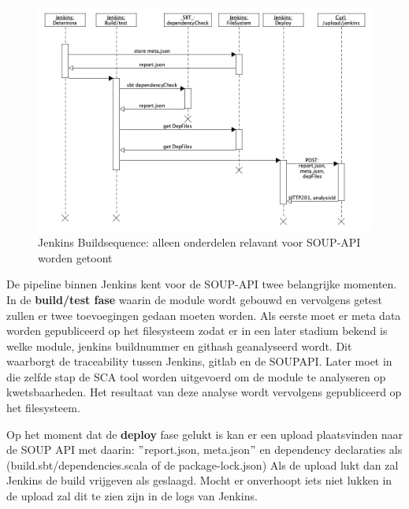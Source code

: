\begin{figure}[bth]
    \myfloatalign
    \includegraphics[width=15cm]{gfx/umlet/exports/jenkinsBuildSequence}
    \caption{Jenkins Buildsequence: alleen onderdelen relavant voor SOUP-API worden getoont}
    \label{fig:JenkinsSequece}
\end{figure}

De pipeline binnen Jenkins kent voor de SOUP-API twee belangrijke momenten. In de \textbf{build/test fase} waarin de module wordt gebouwd en vervolgens getest zullen er twee toevoegingen gedaan moeten worden. Als eerste moet er meta data worden gepubliceerd op het filesysteem zodat er in een later stadium bekend is welke module, jenkins buildnummer en githash geanalyseerd wordt. Dit waarborgt de traceability tussen Jenkins, gitlab en de SOUPAPI. Later moet in die zelfde stap de SCA tool worden uitgevoerd om de module te analyseren op kwetsbaarheden. Het resultaat van deze analyse wordt vervolgens gepubliceerd op het filesysteem.

Op het moment dat de \textbf{deploy} fase gelukt is kan er een upload plaatsvinden naar de SOUP API met daarin: $"$report.json, meta.json$"$ en dependency declaraties als (build.sbt/dependencies.scala of de package-lock.json)
Als de upload lukt dan zal Jenkins de build vrijgeven als geslaagd. Mocht er onverhoopt iets niet lukken in de upload zal dit te zien zijn in de logs van Jenkins.

